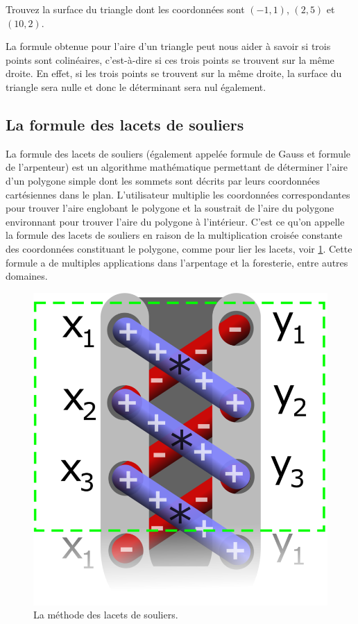 \documentclass[]{book}
\theoremstyle{definition}
\theoremstyle{definition}
\theoremstyle{definition}
\theoremstyle{remark}
\let\BeginKnitrBlock\begin \let\EndKnitrBlock\end
\begin{document}
\BeginKnitrBlock{example}
\protect\hypertarget{exm:unnamed-chunk-120}{}{\label{exm:unnamed-chunk-120} }Trouvez la surface du triangle dont les coordonnées sont \((-1,1)\), \((2,5)\) et \((10,2)\).
\EndKnitrBlock{example}

La formule obtenue pour l'aire d'un triangle peut nous aider à savoir si trois points sont colinéaires, c'est-à-dire si ces trois points se trouvent sur la même droite. En effet, si les trois points se trouvent sur la même droite, la surface du triangle sera nulle et donc le déterminant sera nul également.

\hypertarget{la-formule-des-lacets-de-souliers}{%
\subsection{La formule des lacets de souliers}\label{la-formule-des-lacets-de-souliers}}

La formule des lacets de souliers (également appelée formule de Gauss et formule de l'arpenteur) est un algorithme mathématique permettant de déterminer l'aire d'un polygone simple dont les sommets sont décrits par leurs coordonnées cartésiennes dans le plan. L'utilisateur multiplie les coordonnées correspondantes pour trouver l'aire englobant le polygone et la soustrait de l'aire du polygone environnant pour trouver l'aire du polygone à l'intérieur. C'est ce qu'on appelle la formule des lacets de souliers en raison de la multiplication croisée constante des coordonnées constituant le polygone, comme pour lier les lacets, voir \ref{fig:shoelace}. Cette formule a de multiples applications dans l'arpentage et la foresterie, entre autres domaines.

\begin{figure}

{\centering \includegraphics[width=0.5\linewidth]{resources/images/Shoelace} 

}

\caption{La méthode des lacets de souliers.}\label{fig:shoelace}
\end{figure}
\end{document}
